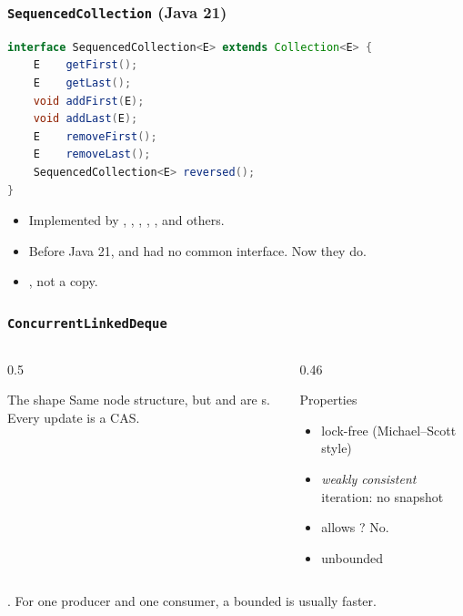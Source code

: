 \documentclass[aspectratio=169,10pt,compress]{beamer}
\begin{document}
\begin{frame}[t,fragile] \frametitle{\texttt{SequencedCollection} (Java 21)}
\begin{lstlisting}[language=Java, basicstyle=\ttfamily\small, frame=single, xleftmargin=2em]
interface SequencedCollection<E> extends Collection<E> {
    E    getFirst();
    E    getLast();
    void addFirst(E);
    void addLast(E);
    E    removeFirst();
    E    removeLast();
    SequencedCollection<E> reversed();
}
\end{lstlisting}
  \begin{itemize}\small
    \item Implemented by , ,
          , , ,
          and others.
    \item Before Java 21,  and 
          had no common interface. Now they do.
    \item {}, not a copy.
  \end{itemize}
\end{frame}




\begin{frame}[t,fragile] \frametitle{\texttt{ConcurrentLinkedDeque}}
  \begin{columns}[T]
    \begin{column}{0.5\textwidth}
      \begin{block}{The shape}
        \small
        Same node structure, but  and  are
        s. Every update is a CAS.
      \end{block}
    \end{column}
    \begin{column}{0.46\textwidth}
      \begin{block}{Properties}
        \small
        \begin{itemize}
          \item lock-free (Michael--Scott style)
          \item \emph{weakly consistent} iteration: no snapshot
          \item allows ? No.
          \item unbounded
        \end{itemize}
      \end{block}
    \end{column}
  \end{columns}
  \vspace{0.4em}
  \small
  .
  For one producer and one consumer, a bounded
   is usually faster.
\end{frame}
\end{document}
